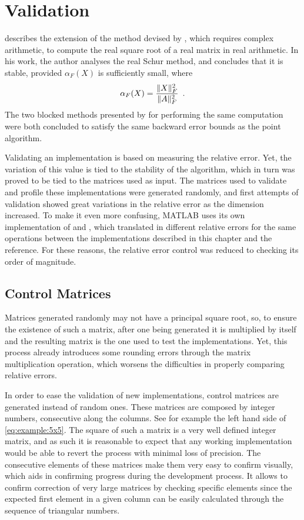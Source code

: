 \documentclass[../thesis]{subfiles}
\begin{document}
	\section{Validation}

	 describes the extension of the method devised by \citeauthor{bjorck:hammarling:1983}, which requires complex arithmetic, to compute the real square root of a real matrix in real arithmetic. In his work, the author analyses the real Schur method, and concludes that it is stable, provided $\alpha_F(X)$ is sufficiently small, where $$\alpha_F(X) = \frac{\lVert X\rVert_F^2}{\lVert A\rVert_F^2}\enspace.$$ The two blocked methods presented by  for performing the same computation were both concluded to satisfy the same backward error bounds as the point algorithm.

	Validating an implementation is based on measuring the relative error. Yet, the variation of this value is tied to the stability of the algorithm, which in turn was proved to be tied to the matrices used as input. The matrices used to validate and profile these implementations were generated randomly, and first attempts of validation showed great variations in the relative error as the dimension increased. To make it even more confusing, MATLAB uses its own implementation of \blas and \lapack, which translated in different relative errors for the same operations between the implementations described in this chapter and the reference. For these reasons, the relative error control was reduced to checking its order of magnitude.

		\subsection{Control Matrices}
		Matrices generated randomly may not have a principal square root, so, to ensure the existence of such a matrix, after one being generated it is multiplied by itself and the resulting matrix is the one used to test the implementations. Yet, this process already introduces some rounding errors through the matrix multiplication operation, which worsens the difficulties in properly comparing relative errors.

		In order to ease the validation of new implementations, control matrices are generated instead of random ones. These matrices are composed by integer numbers, consecutive along the columns. See for example the left hand side of \cref{eq:example:5x5}. The square of such a matrix is a very well defined integer matrix, and as such it is reasonable to expect that any working implementation would be able to revert the process with minimal loss of precision. The consecutive elements of these matrices make them very easy to confirm visually, which aids in confirming progress during the development process. It allows to confirm correction of very large matrices by checking specific elements since the expected first element in a given column can be easily calculated through the sequence of triangular numbers.
\end{document}
